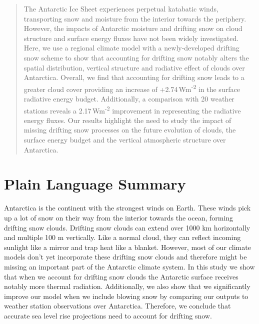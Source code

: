 \documentclass[draft]{agujournal2019}
\begin{document}

\begin{abstract}
The Antarctic Ice Sheet experiences perpetual katabatic winds, transporting snow and moisture from the interior towards the periphery. However, the impacts of Antarctic moisture and drifting snow on cloud structure and surface energy fluxes have not been widely investigated. Here, we use a regional climate model with a newly-developed drifting snow scheme to show that accounting for drifting snow notably alters the spatial distribution, vertical structure and radiative effect of clouds over Antarctica. Overall, we find that accounting for drifting snow leads to a greater cloud cover providing an increase of +2.74\,Wm\textsuperscript{-2} in the surface radiative energy budget. Additionally, a comparison with 20 weather stations reveals a 2.17\,Wm\textsuperscript{-2} improvement in representing the radiative energy fluxes. Our results highlight the need to study the impact of missing drifting snow processes on the future evolution of clouds, the surface energy budget and the vertical atmospheric structure over Antarctica.
\end{abstract}

\section*{Plain Language Summary}
Antarctica is the continent with the strongest winds on Earth. These winds pick up a lot of snow on their way from the interior towards the ocean, forming drifting snow clouds. Drifting snow clouds can extend over 1000 km horizontally and multiple 100 m vertically. Like a normal cloud, they can reflect incoming sunlight like a mirror and trap heat like a blanket. However, most of our climate models don't yet incorporate these drifting snow clouds and therefore might be missing an important part of the Antarctic climate system. In this study we show that when we account for drifting snow clouds the Antarctic surface receives notably more thermal radiation. Additionally, we also show that we significantly improve our model when we include blowing snow by comparing our outputs to weather station observations over Antarctica. Therefore, we conclude that accurate sea level rise projections need to account for drifting snow.


%
%
\end{document}
